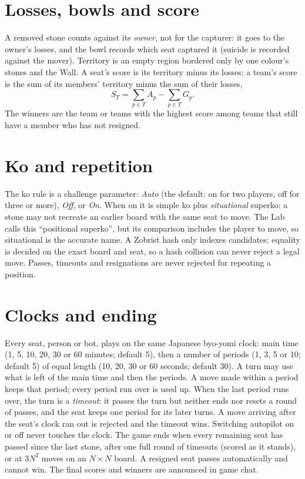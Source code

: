 \documentclass[11pt,oneside]{book}
\begin{document}
\section{Losses, bowls and score}
A removed stone counts against its \emph{owner}, not for the capturer: it goes
to the owner's losses, and the bowl records which seat captured it (suicide is
recorded against the mover). Territory is an empty region bordered only by one
colour's stones and the Wall. A seat's score is its territory minus its losses;
a team's score is the sum of its members' territory minus the sum of their
losses,
\[
  S_T = \sum_{p\in T} A_p - \sum_{p\in T} G_p .
\]
The winners are the team or teams with the highest score among teams that still
have a member who has not resigned.

\section{Ko and repetition}
The ko rule is a challenge parameter: \emph{Auto} (the default: on for two
players, off for three or more), \emph{Off}, or \emph{On}. When on it is simple
ko plus \emph{situational} superko: a stone may not recreate an earlier board
with the same seat to move. The Lab calls this ``positional superko'', but its
comparison includes the player to move, so situational is the accurate name.
A Zobrist hash only indexes candidates; equality is decided on the exact board
and seat, so a hash collision can never reject a legal move. Passes, timeouts
and resignations are never rejected for repeating a position.

\section{Clocks and ending}
Every seat, person or bot, plays on the same Japanese byo-yomi clock: main time
(1, 5, 10, 20, 30 or 60 minutes; default 5), then a number of periods (1, 3, 5
or 10; default 5) of equal length (10, 20, 30 or 60 seconds; default 30). A turn
may use what is left of the main time and then the periods. A move made within
a period keeps that period; every period run over is used up. When the last
period runs over, the turn is a \emph{timeout}: it passes the turn but neither
ends nor resets a round of passes, and the seat keeps one period for its later
turns. A move arriving after the seat's clock ran out is rejected and the
timeout wins. Switching autopilot on or off never touches the clock. The game ends when every remaining seat has passed since
the last stone, after one full round of timeouts (scored as it stands), or at
\(3N^2\) moves on an \(N\times N\) board. A resigned seat passes automatically
and cannot win. The final scores and winners are announced in game chat.
\end{document}
